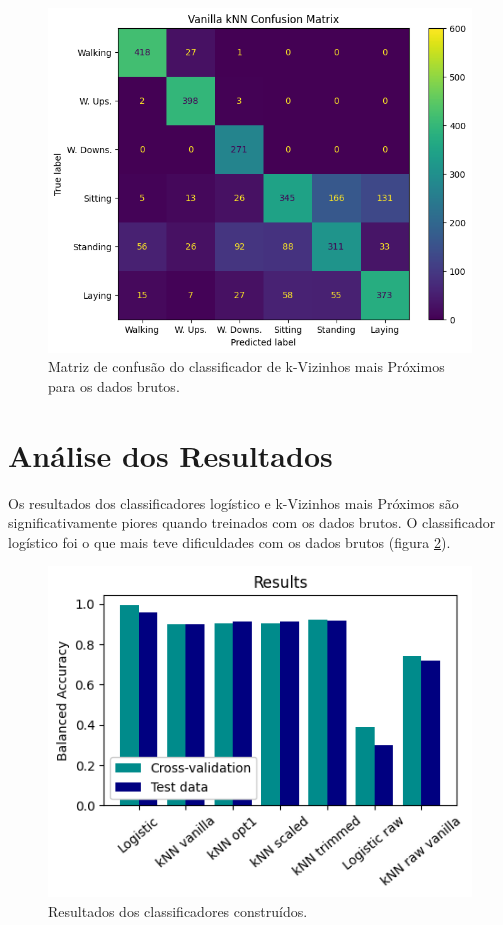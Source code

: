 \documentclass[final,5p]{elsarticle}
\numberwithin{equation}{section}
\begin{document}
        \begin{figure}[hbt!]
            \includegraphics[width=0.95\columnwidth]{B_kNN_Vanilla_CM.png}
            \caption{Matriz de confusão do classificador de k-Vizinhos mais Próximos para os dados brutos.}
            \label{fig:cm_knn_vanilla_brutos}
        \end{figure}

\section{Análise dos Resultados}

        Os resultados dos classificadores logístico e k-Vizinhos mais Próximos são significativamente piores quando treinados com os dados brutos. O classificador logístico foi o que mais teve dificuldades com os dados brutos (figura \ref{fig:resultados}).

        \begin{figure}[hbt!]
            \includegraphics[width=0.95\columnwidth]{C_Results.png}
            \caption{Resultados dos classificadores construídos.}
            \label{fig:resultados}
        \end{figure}
\end{document}
